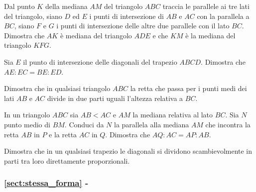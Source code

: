 \begin{multicols}{2}
\begin{esercizio}
\label{ese:6.46}
Dal punto $K$ della mediana $AM$ del triangolo $ABC$ traccia le 
parallele ai tre lati del triangolo, siano $D$ ed $E$ i punti di 
intersezione di $AB$ e $AC$ con la parallela a $BC$, siano $F$ e $G$ 
i punti di intersezione delle altre due parallele con il lato $BC$. 
Dimostra che $AK$ è mediana del triangolo $ADE$ e che $KM$ è la 
mediana del triangolo $KFG$.
\end{esercizio}

\begin{esercizio}
\label{ese:6.47}
Sia $E$ il punto di intersezione delle diagonali del trapezio $ABCD$. 
Dimostra che $AE : EC = BE : ED$.
\end{esercizio}

\begin{esercizio}
\label{ese:6.48}
Dimostra che in qualsiasi triangolo $ABC$ la retta che passa per i 
punti medi dei lati $AB$ e $AC$ divide in due parti uguali l'altezza 
relativa a $BC$.
\end{esercizio}

\begin{esercizio}
\label{ese:6.49}
In un triangolo $ABC$ sia $AB<AC$ e $AM$ la mediana relativa al lato 
$BC$. Sia $N$ punto medio di $BM$. Conduci da $N$ la parallela alla 
mediana $AM$ che incontra la retta $AB$ in $P$ e la retta $AC$ in 
$Q$. Dimostra che $AQ : AC = AP : AB$.
\end{esercizio}

\begin{esercizio}
\label{ese:6.50}
Dimostra che in un qualsiasi trapezio le diagonali si dividono 
scambievolmente in parti tra loro direttamente proporzionali.
\end{esercizio}

\end{multicols}

\begingroup
\hypersetup{linkcolor=black}
\subsubsection*{\ref{sect:stessa_forma} - }
\endgroup

